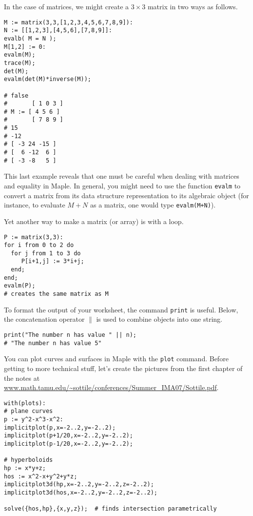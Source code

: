\documentclass[12pt]{amsart}
\begin{document}
In the case of matrices, we might create a $3 \times 3$ matrix in two ways as follows.

\begin{verbatim}
M := matrix(3,3,[1,2,3,4,5,6,7,8,9]):
N := [[1,2,3],[4,5,6],[7,8,9]]:
evalb( M = N );
M[1,2] := 0:
evalm(M);
trace(M);
det(M);
evalm(det(M)*inverse(M));

# false
# 	    [ 1 0 3 ]
# M := [ 4 5 6 ]
# 	    [ 7 8 9 ]
# 15
# -12
# [ -3 24 -15 ]
# [  6 -12  6 ]
# [ -3 -8   5 ]
\end{verbatim}

This last example reveals that one must be careful when dealing with
matrices and equality in Maple.  In general, you might need to use the function
 \texttt{evalm} to convert a matrix from its data structure representation to its algebraic
 object (for instance, to evaluate $M+N$ as a matrix, one would type \texttt{evalm(M+N)}).

Yet another way to make a matrix (or array) is with a loop.

\begin{verbatim}
P := matrix(3,3):
for i from 0 to 2 do
  for j from 1 to 3 do
     P[i+1,j] := 3*i+j;
  end;
end;
evalm(P);
# creates the same matrix as M
\end{verbatim}

To format the output of your worksheet, the command \texttt{print} is useful.  Below, the
concatenation operator $\|$ is used to combine objects into one string.

\begin{verbatim}
print("The number n has value " || n);
# "The number n has value 5"
\end{verbatim}

You can plot curves and surfaces in Maple with the \texttt{plot} command. 
Before getting to more technical stuff, let's create the pictures from the first chapter
of the notes at \url{www.math.tamu.edu/~sottile/conferences/Summer_IMA07/Sottile.pdf}.

\begin{verbatim}
with(plots):
# plane curves
p := y^2-x^3-x^2:
implicitplot(p,x=-2..2,y=-2..2);
implicitplot(p+1/20,x=-2..2,y=-2..2);
implicitplot(p-1/20,x=-2..2,y=-2..2);

# hyperboloids
hp := x*y+z;
hos := x^2-x+y^2+y*z;
implicitplot3d(hp,x=-2..2,y=-2..2,z=-2..2);
implicitplot3d(hos,x=-2..2,y=-2..2,z=-2..2);

solve({hos,hp},{x,y,z});  # finds intersection parametrically
\end{verbatim}
\end{document}
